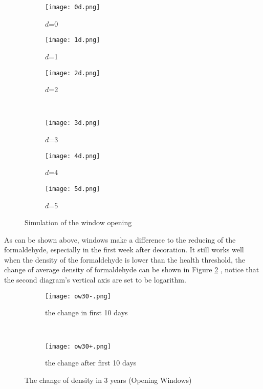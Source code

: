 \documentclass{mcmthesis}
\begin{document}
\begin{figure}[H]
  \centering
  \begin{subfigure}[b]{0.3\linewidth}
    \texttt{[image: 0d.png]}
    \caption{$d$=0}
  \end{subfigure}
  \begin{subfigure}[b]{0.3\linewidth}
    \texttt{[image: 1d.png]}
    \caption{$d$=1}
  \end{subfigure}
  \begin{subfigure}[b]{0.3\linewidth}
    \texttt{[image: 2d.png]}
    \caption{$d$=2}
  \end{subfigure}\\
  \begin{subfigure}[b]{0.3\linewidth}
    \texttt{[image: 3d.png]}
    \caption{$d$=3}
  \end{subfigure}
  \begin{subfigure}[b]{0.3\linewidth}
    \texttt{[image: 4d.png]}
    \caption{$d$=4}
  \end{subfigure}
  \begin{subfigure}[b]{0.3\linewidth}
    \texttt{[image: 5d.png]}
    \caption{$d$=5}
  \end{subfigure}
  \caption{Simulation of the window opening}
  \label{fig:window}
\end{figure}

 As can be shown above, windows make a difference to the reducing of the formaldehyde, especially in the first week after decoration. It still works well when the density of the formaldehyde is lower than the health threshold, the change of average density of formaldehyde can be shown in Figure \ref{fig:ow} , notice that the second diagram's vertical axis are set to be logarithm.
 
 \begin{figure}[H]
  \centering
  \begin{subfigure}[b]{\linewidth}
    \texttt{[image: ow30-.png]}
    \caption{the change in first 10 days}
  \end{subfigure}\\
  \begin{subfigure}[b]{\linewidth}
    \texttt{[image: ow30+.png]}
    \caption{the change after first 10 days}
  \end{subfigure}
  \caption{The change of density in 3 years (Opening Windows)}
  \label{fig:ow}
\end{figure}
\end{document}
